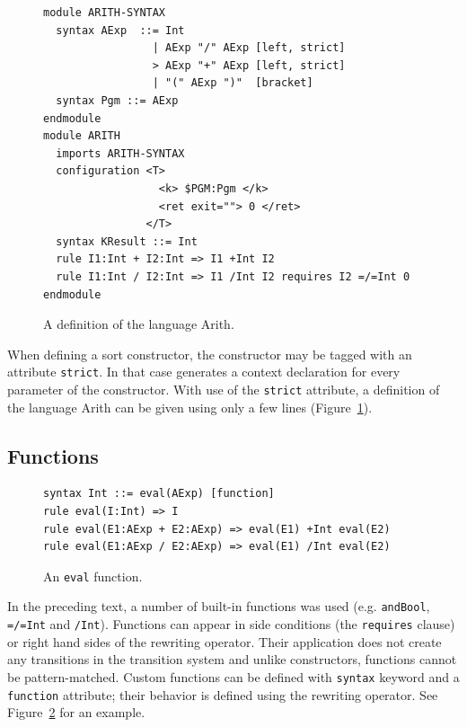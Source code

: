 \documentclass{fithesis3}
\begin{document}
\begin{figure}
\begin{lstlisting}
module ARITH-SYNTAX
  syntax AExp  ::= Int
                 | AExp "/" AExp [left, strict]
                 > AExp "+" AExp [left, strict]
                 | "(" AExp ")"  [bracket]
  syntax Pgm ::= AExp
endmodule
module ARITH
  imports ARITH-SYNTAX
  configuration <T>
                  <k> $PGM:Pgm </k>
                  <ret exit=""> 0 </ret>
                </T>
  syntax KResult ::= Int
  rule I1:Int + I2:Int => I1 +Int I2
  rule I1:Int / I2:Int => I1 /Int I2 requires I2 =/=Int 0
endmodule
\end{lstlisting}
\caption{A definition of the language Arith.}
\label{arithFinal}
\end{figure}

When defining a sort constructor, the constructor may be tagged with an attribute \texttt{strict}. In that case \K generates a context declaration for every parameter of the constructor. With use of the \texttt{strict} attribute, a definition of the language Arith can be given using only a few lines (Figure~\ref{arithFinal}).


\subsection{Functions}

\begin{figure}
\begin{lstlisting}
syntax Int ::= eval(AExp) [function]
rule eval(I:Int) => I
rule eval(E1:AExp + E2:AExp) => eval(E1) +Int eval(E2)
rule eval(E1:AExp / E2:AExp) => eval(E1) /Int eval(E2)
\end{lstlisting}
\caption{An \texttt{eval} function.}
\label{figAnEvalFunction}
\end{figure}

In the preceding text, a number of built-in functions was used (e.g. \texttt{andBool}, \texttt{=/=Int} and \texttt{/Int}). Functions can appear in side conditions (the \texttt{requires} clause) or right hand sides of the rewriting operator. Their application does not create any transitions in the transition system and unlike constructors, functions cannot be pattern-matched. Custom functions can be defined with \texttt{syntax} keyword and a \texttt{function} attribute; their behavior is defined using the rewriting operator. See Figure~\ref{figAnEvalFunction} for an example. 
\end{document}
